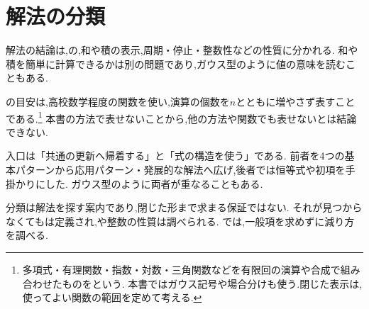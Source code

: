 
\section{解法の分類}\label{節：解法の分類}

解法の結論は,の,和や積の表示,周期・停止・整数性などの性質に分かれる.
和や積を簡単に計算できるかは別の問題であり,ガウス型のように値の意味を読むこともある.

の目安は,高校数学程度の関数を使い,演算の個数を$n$とともに増やさず表すことである.\footnote{多項式・有理関数・指数・対数・三角関数などを有限回の演算や合成で組み合わせたものをという.
  本書ではガウス記号や場合分けも使う.閉じた表示は,使ってよい関数の範囲を定めて考える.}
本書の方法で表せないことから,他の方法や関数でも表せないとは結論できない.

入口は「共通の更新へ帰着する」と「式の構造を使う」である.
前者を4つの基本パターンから応用パターン・発展的な解法へ広げ,後者では恒等式や初項を手掛かりにした.
ガウス型のように両者が重なることもある.
\BookFigClassification

分類は解法を探す案内であり,閉じた形まで求まる保証ではない.
それが見つからなくてもは定義され,や整数の性質は調べられる.
では,一般項を求めずに減り方を調べる.
